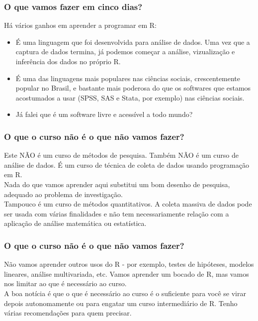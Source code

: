 \documentclass[11pt]{beamer}
\begin{document}
\begin{frame}
	\frametitle{O que vamos fazer em cinco dias?}
	Há vários ganhos em aprender a programar em R:
	\begin{itemize}
		\item É uma linguagem que foi desenvolvida para análise de dados. Uma vez que a captura de dados termina, já podemos começar a análise, vizualização e inferência dos dados no próprio R.
		\item É uma das linguagens mais populares nas ciências sociais, crescentemente popular no Brasil, e bastante mais poderosa do que os softwares que estamos acostumados a usar (SPSS, SAS e Stata, por exemplo) nas ciências sociais.
		\item Já falei que é um software livre e acessível a todo mundo?		
	\end{itemize}
\end{frame}

\begin{frame}
	\frametitle{O que o curso não é o que não vamos fazer?}
	Este NÃO é um curso de métodos de pesquisa. Também NÃO é um curso de análise de dados. É um curso de técnica de coleta de dados usando programação em R.
	\newline\\
	Nada do que vamos aprender aqui substitui um bom desenho de pesquisa, adequado ao problema de investigação.
	\newline\\
	Tampouco é um curso de métodos quantitativos. A coleta massiva de dados pode ser usada com várias finalidades e não tem necessariamente relação com a aplicação de análise matemática ou estatística.
\end{frame}

\begin{frame}
	\frametitle{O que o curso não é o que não vamos fazer?}
	Não vamos aprender outros usos do R - por exemplo, testes de hipóteses, modelos lineares, análise multivariada, etc. Vamos aprender um bocado de R, mas vamos nos limitar ao que é necessário ao curso.
	\newline\\
	A boa notícia é que o que é necessário ao curso é o suficiente para você se virar depois autonomamente ou para engatar um curso intermediário de R. Tenho várias recomendações para quem precisar.
\end{frame}
\end{document}

